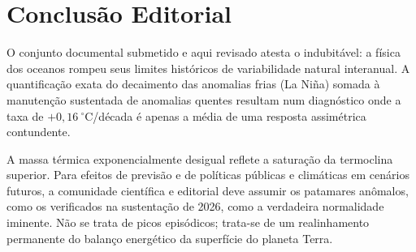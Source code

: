 \documentclass[11pt,a4paper]{article}
\begin{document}
\section{Conclusão Editorial}
O conjunto documental submetido e aqui revisado atesta o indubitável: a física dos oceanos rompeu seus limites históricos de variabilidade natural interanual. A quantificação exata do decaimento das anomalias frias (La Niña) somada à manutenção sustentada de anomalias quentes resultam num diagnóstico onde a taxa de $+0,16\ ^\circ\text{C}$/década é apenas a média de uma resposta assimétrica contundente.

A massa térmica exponencialmente desigual reflete a saturação da termoclina superior. Para efeitos de previsão e de políticas públicas e climáticas em cenários futuros, a comunidade científica e editorial deve assumir os patamares anômalos, como os verificados na sustentação de 2026, como a verdadeira normalidade iminente. Não se trata de picos episódicos; trata-se de um realinhamento permanente do balanço energético da superfície do planeta Terra.
\end{document}

